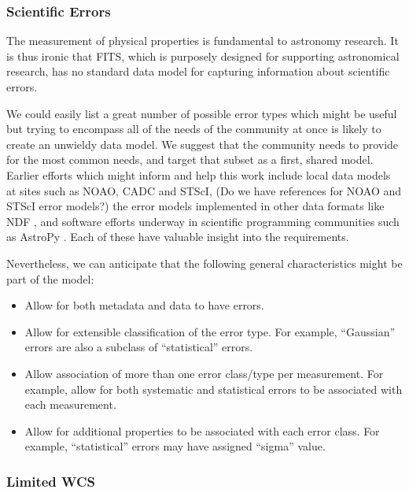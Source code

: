 \documentclass[final,authoryear,5p,times,twocolumn]{elsarticle}
\begin{document}
\subsubsection{Scientific Errors}


The measurement of physical properties is fundamental to astronomy
research. It is thus ironic that FITS, which is purposely designed for
supporting astronomical research, has no standard data model for
capturing information about scientific errors.


We could easily list a great number of possible error types which
might be useful but trying to encompass all of the needs of the
community at once is likely to create an unwieldy data model. We
suggest that the community needs to provide for the most common needs,
and target that subset as a first, shared model. Earlier efforts which
might inform and help this work include local data models at sites
such as NOAO, CADC \citep{2012ASPC..461..339D} and STScI,
{\color{red} (Do we have references for NOAO and STScI error models?)}
the error
models implemented in other data formats like NDF
\citep[although see for example][]{1991StarB...8...19M}, and software
efforts underway in scientific programming communities such as AstroPy
\citep{2013A&A...558A..33A}. Each of these have valuable insight into
the requirements.


Nevertheless, we can anticipate that the following general
characteristics might be part of the model:

\begin{itemize}
\item Allow for both metadata and data to have errors.

\item Allow for extensible classification of the error type. For example,
``Gaussian'' errors are also a subclass of ``statistical'' errors.

\item Allow association of more than one error class/type per
measurement. For example, allow for both systematic and statistical
errors to be associated with each measurement.

\item Allow for additional properties to be associated with each error
class. For example, ``statistical'' errors may have assigned ``sigma''
value.
\end{itemize}

\subsubsection{Limited WCS\label{sec:wcs}}
\end{document}

